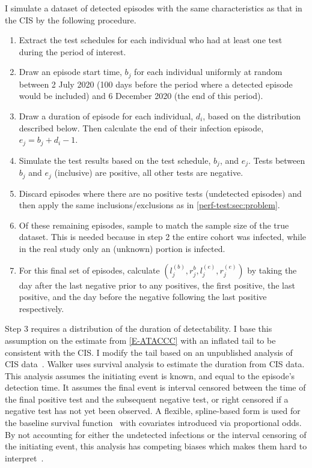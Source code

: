 \documentclass[thesis.tex]{subfiles}
\begin{document}
I simulate a dataset of detected episodes with the same characteristics as that in the CIS by the following procedure.
\begin{enumerate}
    \item Extract the test schedules for each individual who had at least one test during the period of interest.
    \item Draw an episode start time, $b_{j}$ for each individual uniformly at random between 2 July 2020 (100 days before the period where a detected episode would be included) and 6 December 2020 (the end of this period).
    \item Draw a duration of episode for each individual, $d_i$, based on the distribution described below. Then calculate the end of their infection episode, $e_{j} = b_{j} + d_i - 1$.
    \item Simulate the test results based on the test schedule, $b_{j}$, and $e_{j}$. Tests between $b_{j}$ and $e_{j}$ (inclusive) are positive, all other tests are negative.
    \item Discard episodes where there are no positive tests (\ie undetected episodes) and then apply the same inclusions/exclusions as in \cref{perf-test:sec:problem}.
    \item Of these remaining episodes, sample  to match the sample size of the true dataset. This is needed because in step 2 the entire cohort was infected, while in the real study only an (unknown) portion is infected.
    \item For this final set of episodes, calculate $(l_j^{(b)}, r_j^{b}, l_j^{(e)}, r_j^{(e)})$ by taking the day after the last negative prior to any positives, the first positive, the last positive, and the day before the negative following the last positive respectively.
\end{enumerate}

Step 3 requires a distribution of the duration of detectability.
I base this assumption on the estimate from \cref{E-ATACCC} with an inflated tail to be consistent with the CIS.
I modify the tail based on an unpublished analysis of CIS data~.
Walker uses survival analysis to estimate the duration from CIS data.
This analysis assumes the initiating event is known, and equal to the episode’s detection time. 
It assumes the final event is interval censored between the time of the final positive test and the subsequent negative test, or right censored if a negative test has not yet been observed.
A flexible, spline-based form is used for the baseline survival function~\autocite{roystonSTPM,roystonFlexible} with covariates introduced via proportional odds.
By not accounting for either the undetected infections or the interval censoring of the initiating event, this analysis has competing biases which makes them hard to interpret~\autocite{cisMethodsONS}.
\end{document}
